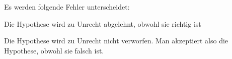 \documentclass[11pt]{article}
\begin{document}
Es werden folgende Fehler unterscheidet:
\begin{description}[labelindent=16pt,style=multiline,leftmargin=4cm, noitemsep]
	\item[Fehler 1. Art:] Die Hypothese wird zu Unrecht abgelehnt, obwohl sie richtig ist
	\item[Fehler 2. Art:] Die Hypothese wird zu Unrecht nicht verworfen. Man akzeptiert also die Hypothese, obwohl sie falsch ist.
\end{description}
\end{document}
